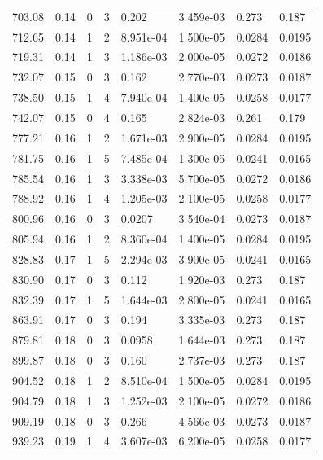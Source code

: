 \documentclass[preview]{standalone}
\begin{document}
{{{\begin{tabular}{L{1.2cm}C{1.2cm} C{0.3cm}C{0.5cm} C{1.4cm}C{1.4cm} C{1.4cm}C{1.4cm}}
  703.08  &  0.14  & 0     &  3 &  0.202  & 3.459e-03  & 0.273 &  0.187   \\ 
  712.65  &  0.14  & 1     &  2 &  8.951e-04  & 1.500e-05  & 0.0284 &  0.0195   \\ 
  719.31  &  0.14  & 1     &  3 &  1.186e-03  & 2.000e-05  & 0.0272 &  0.0186   \\ 
  732.07  &  0.15  & 0     &  3 &  0.162  & 2.770e-03  & 0.0273 &  0.0187   \\ 
  738.50  &  0.15  & 1     &  4 &  7.940e-04  & 1.400e-05  & 0.0258 &  0.0177   \\ 
  742.07  &  0.15  & 0     &  4 &  0.165  & 2.824e-03  & 0.261 &  0.179   \\ 
  777.21  &  0.16  & 1     &  2 &  1.671e-03  & 2.900e-05  & 0.0284 &  0.0195   \\ 
  781.75  &  0.16  & 1     &  5 &  7.485e-04  & 1.300e-05  & 0.0241 &  0.0165   \\ 
  785.54  &  0.16  & 1     &  3 &  3.338e-03  & 5.700e-05  & 0.0272 &  0.0186   \\ 
  788.92  &  0.16  & 1     &  4 &  1.205e-03  & 2.100e-05  & 0.0258 &  0.0177   \\ 
  800.96  &  0.16  & 0     &  3 &  0.0207  & 3.540e-04  & 0.0273 &  0.0187   \\ 
  805.94  &  0.16  & 1     &  2 &  8.360e-04  & 1.400e-05  & 0.0284 &  0.0195   \\ 
  828.83  &  0.17  & 1     &  5 &  2.294e-03  & 3.900e-05  & 0.0241 &  0.0165   \\ 
  830.90  &  0.17  & 0     &  3 &  0.112  & 1.920e-03  & 0.273 &  0.187   \\ 
  832.39  &  0.17  & 1     &  5 &  1.644e-03  & 2.800e-05  & 0.0241 &  0.0165   \\ 
  863.91  &  0.17  & 0     &  3 &  0.194  & 3.335e-03  & 0.273 &  0.187   \\ 
  879.81  &  0.18  & 0     &  3 &  0.0958  & 1.644e-03  & 0.273 &  0.187   \\ 
  899.87  &  0.18  & 0     &  3 &  0.160  & 2.737e-03  & 0.273 &  0.187   \\ 
  904.52  &  0.18  & 1     &  2 &  8.510e-04  & 1.500e-05  & 0.0284 &  0.0195   \\ 
  904.79  &  0.18  & 1     &  3 &  1.252e-03  & 2.100e-05  & 0.0272 &  0.0186   \\ 
  909.19  &  0.18  & 0     &  3 &  0.266  & 4.566e-03  & 0.0273 &  0.0187   \\ 
  939.23  &  0.19  & 1     &  4 &  3.607e-03  & 6.200e-05  & 0.0258 &  0.0177   \\ 

\end{tabular}}}}
\end{document}
